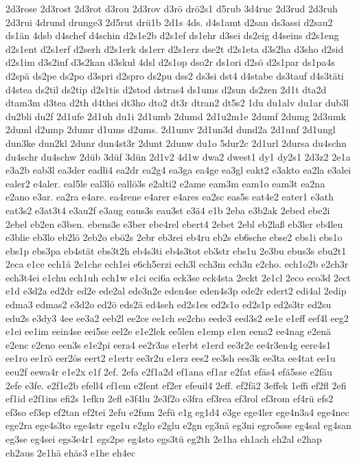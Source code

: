 {2d3rose
2d3rost
2d3rot
d3rou
2d3rov
d3rö
drö2s1
d5rub
3d4ruc
2d3rud
2d3ruh
2d3rui
4drund
drunge3
2d5rut
drü1b
2d1s
4ds.
d4s1amt
d2san
ds3assi
d2sau2
ds1än
4dsb
d4schef
d4schin
d2s1e2b
d2s1ef
ds1ehr
d3sei
ds2eig
d4seins
d2s1eng
d2s1ent
d2s1erf
d2serh
d2s1erk
ds1err
d2s1erz
dse2t
d2s1eta
d3s2ha
d3sho
d2sid
d2s1im
d3s2inf
d3s2kan
d3skul
4dsl
d2s1op
dso2r
ds1ori
d2sö
d2s1par
ds1pa4s
d2spä
ds2pe
ds2po
d3spri
d2spro
ds2pu
dss2
ds3si
dst4
d4stabe
ds3tauf
d4s3täti
d4stea
ds2til
ds2tip
d2s1tis
d2stod
dstras4
ds1ums
d2sun
ds2zen
2d1t
dta2d
dtam3m
d3tea
d2th
d4thei
dt3ho
dto2
dt3r
dtran2
dt5s2
1du
du1alv
du1ar
dub3l
du2bli
du2f
2d1ufe
2d1uh
du1i
2d1umb
2dumd
2d1u2m1e
2dumf
2dumg
2d3umk
2duml
d2ump
2dumr
d1ums
d2ums.
2d1umv
2d1un3d
dund2a
2d1unf
2d1ungl
dun3ke
dun2kl
2dunr
dun4st3r
2dunt
2dunw
du1o
5dur2c
2d1url
2dursa
du4schn
du4schr
du4schw
2düb
3düf
3dün
2d1v2
4d1w
dwa2
dwest1
dy1
dy2s1
2d3z2
2e1a
e3a2b
eab3l
ea3der
eadli4
ea2dr
ea2g4
ea3ga
ea4ge
ea3gl
eakt2
e3akto
ea2la
e3alei
ealer2
e4aler.
eal5le
eal3lö
eallö3s
e2alti2
e2ame
eam3m
eam1o
eam3t
ea2na
e2ano
e3ar.
ea2ra
e4are.
ea4rene
e4arer
e4ares
ea2sc
eas5s
eat4e2
eater1
e3ath
eat3s2
e3at3t4
e3au2f
e3aug
eaus3s
eau3st
e3ä4
e1b
2eba
e3b2ak
2ebed
ebe2i
2ebel
eb2en
e3ben.
ebens3e
e3ber
ebe4rel
ebert4
2ebet
2ebl
eb2laß
eb3ler
eb4leu
e3blie
eb3lo
eb2lö
2eb2o
ebö2s
2ebr
eb3rei
eb4ru
eb2s
eb6sche
ebse2
ebs1i
ebs1o
ebs1p
ebs3pa
eb4stät
ebs3t2h
eb4s3ti
eb4s3tot
eb3str
ebs1u
2e3bu
ebus3s
ebu2t1
2eca
e1ce
ech1ä
2e1che
ech1ei
e6ch5erzi
ech3l
ech3m
ech3n
e2cho.
ech1o2b
e2ch3r
ech3t4ei
e1chu
ech1uh
ech1w
e1ci
eci6a
eck3se
eck4sta
2eckt
2e1cl
2eco
eco3d
2ect
e1d
e3d2a
ed2dr
ed2e
ede2al
ede3n2e
eden4se
eden4s3p
ede2r
edert2
edi4al
2edip
edma3
edmas2
e3d2o
ed2ö
eds2ä
ed4seh
ed2s1es
ed2s1o
ed2s1p
ed2s3tr
ed2su
edu2s
e3dy3
4ee
ee3a2
eeb2l
ee2ce
ee1ch
ee2cho
eede3
eed3s2
ee1e
e1eff
eef4l
eeg2
e1ei
ee1im
eein4se
eei5se
eel2e
e1e2lek
ee5len
e1emp
e1en
eena2
ee4nag
e2enä
e2enc
e2eno
een3s
e1e2pi
eera4
ee2r3as
e1erbt
e1erd
ee3r2e
ee4r3en4g
eere4s1
ee1ro
ee1rö
eer2ös
eert2
e1ertr
ee3r2u
e1erz
ees2
ee3sh
ees3k
ee3ta
ee4tat
ee1u
eeu2f
eewa4r
e1e2x
e1f
2ef.
2efa
e2f1a2d
ef1ana
ef1ar
e2fat
efäs4
efä5sse
e2fäu
2efe
e3fe.
e2f1e2b
efell4
ef1em
e2fent
ef2er
efeuil4
2eff.
ef2fä2
3effek
1effi
ef2fl
2efi
ef1id
e2f1ins
efi2s
1efku
2efl
e3f4lu
2e3f2o
e3fra
ef3rea
ef3rol
ef3rom
ef4rü
efs2
ef3so
ef3sp
ef2tan
ef2tei
2efu
e2fum
2efü
e1g
eg1d4
e3ge
ege4ler
ege4n3a4
ege4nec
ege2ra
ege4s3to
ege4str
ege1u
e2glo
e2glu
e2gn
eg3nä
eg3ni
egro5sse
eg4sal
eg4san
eg3se
eg4sei
egs3e4r1
egs2pe
eg4sto
egs3tü
eg2th
2e1ha
eh1ach
eh2al
e2hap
eh2aus
2e1hä
ehäs3
e1he
eh4ec
}
